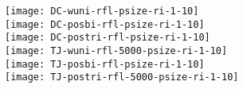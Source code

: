 \documentclass[a4paper]{article}
\begin{document}
\texttt{[image: DC-wuni-rfl-psize-ri-1-10]}\\
\texttt{[image: DC-posbi-rfl-psize-ri-1-10]}\\
\texttt{[image: DC-postri-rfl-psize-ri-1-10]}\\
\texttt{[image: TJ-wuni-rfl-5000-psize-ri-1-10]}\\
\texttt{[image: TJ-posbi-rfl-psize-ri-1-10]}\\
\texttt{[image: TJ-postri-rfl-5000-psize-ri-1-10]}\\



\nocite{prokic2012}
\printbibliography
\end{document}
